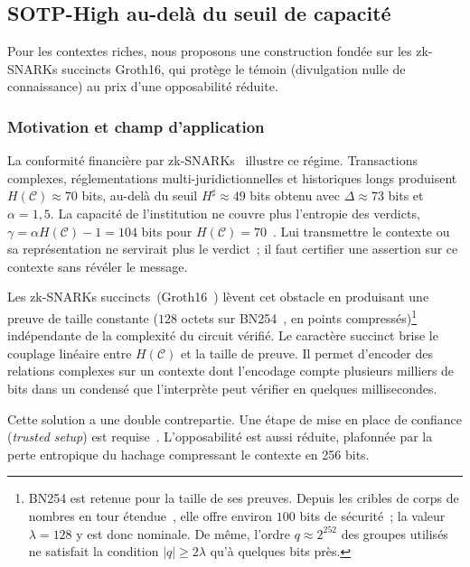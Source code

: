 \subsection{SOTP-High au-del\`a du seuil de capacit\'e}
\label{subsec:sotp_high}
\begin{sloppypar}
Pour les contextes riches, nous proposons une construction fond\'ee sur les zk-SNARKs
succincts Groth16, qui prot\`ege le t\'emoin (divulgation nulle de connaissance) au prix
d'une opposabilit\'e r\'eduite.

\subsubsection{Motivation et champ d'application}
\label{subsubsec:motivation_high}

La conformit\'e financi\`ere par zk-SNARKs~\cite{Groth16,Garratt15,BaselIII} illustre ce r\'egime. Transactions complexes,
r\'eglementations multi-juridictionnelles et historiques longs produisent $H(\mathcal{C})
\approx 70$ bits, au-del\`a du seuil $H^\sharp \approx 49$ bits obtenu avec $\Delta \approx 73$ bits
et $\alpha = 1{,}5$. La capacit\'e de l'institution ne couvre plus l'entropie des verdicts,
$\gamma = \alpha H(\mathcal{C}) - 1 = 104$ bits pour $H(\mathcal{C}) = 70$~\cite{Simon82,Miller56}.
Lui transmettre le contexte ou sa repr\'esentation ne servirait plus le verdict~; il faut certifier
une assertion sur ce contexte sans r\'ev\'eler le message.

Les zk-SNARKs succincts~(Groth16~\cite{Groth16,BCTV14,Gennaro13}) l\`event cet obstacle en produisant une preuve
de taille constante ($128$ octets sur BN254~\cite{BarretoNaehrig2006}, en points compress\'es)\footnote{BN254 est
retenue pour la taille de ses preuves. Depuis les cribles de corps de nombres en tour \'etendue~\cite{KimBarbulescu2016},
elle offre environ $100$ bits de s\'ecurit\'e~; la valeur $\lambda = 128$ y est donc nominale. De m\^eme,
l'ordre $q \approx 2^{252}$ des groupes utilis\'es ne satisfait la condition $|q| \geq 2\lambda$ qu'\`a
quelques bits pr\`es.} ind\'ependante de la complexit\'e du
circuit v\'erifi\'e. Le caract\`ere succinct brise le couplage lin\'eaire entre $H(\mathcal{C})$ et la
taille de preuve. Il permet d'encoder des relations complexes sur un contexte dont l'encodage compte
plusieurs milliers de bits dans un condens\'e que l'interpr\`ete peut v\'erifier en quelques millisecondes.

Cette solution a une double contrepartie. Une \'etape de mise en place de confiance (\emph{trusted
setup}) est requise~\cite{Bowe2017}. L'opposabilit\'e est aussi r\'eduite, plafonn\'ee par la perte
entropique du hachage compressant le contexte en 256 bits.


\end{sloppypar}
